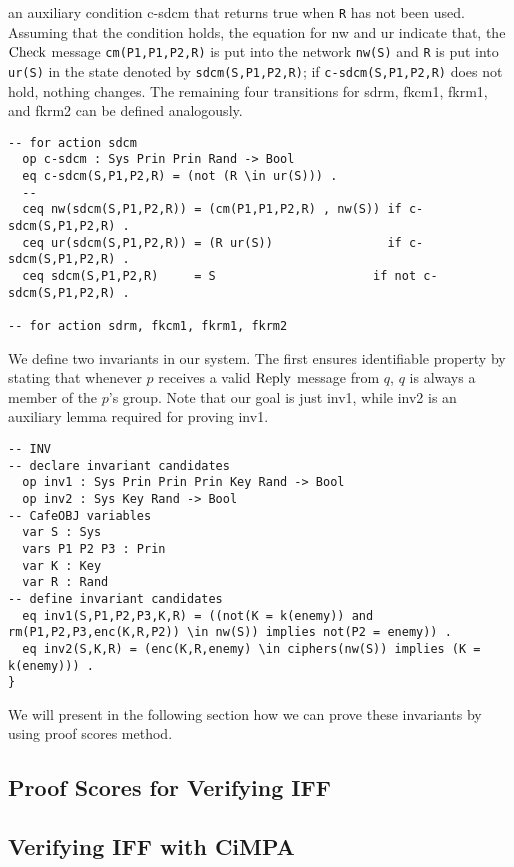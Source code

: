 \documentclass[a4paper,fleqn]{cas-dc}
\begin{document}
an auxiliary condition c-sdcm that returns true when \verb!R! has not been used. Assuming that the condition holds, the equation for nw and ur indicate that, the $\rm Check$ message \verb!cm(P1,P1,P2,R)! is put into the network \verb!nw(S)! and \verb!R! is put into \verb!ur(S)! in the state denoted by \verb!sdcm(S,P1,P2,R)!; if \verb!c-sdcm(S,P1,P2,R)! does not hold, nothing changes. The remaining four transitions for sdrm, fkcm1, fkrm1, and fkrm2 can be defined analogously.
\begin{small}
\begin{verbatim}
-- for action sdcm
  op c-sdcm : Sys Prin Prin Rand -> Bool
  eq c-sdcm(S,P1,P2,R) = (not (R \in ur(S))) .
  --
  ceq nw(sdcm(S,P1,P2,R)) = (cm(P1,P1,P2,R) , nw(S)) if c-sdcm(S,P1,P2,R) .
  ceq ur(sdcm(S,P1,P2,R)) = (R ur(S))                if c-sdcm(S,P1,P2,R) .
  ceq sdcm(S,P1,P2,R)     = S                      if not c-sdcm(S,P1,P2,R) .

-- for action sdrm, fkcm1, fkrm1, fkrm2
\end{verbatim}
\end{small}
We define two invariants in our system. The first ensures identifiable property by stating that whenever $p$ receives a valid $\rm Reply$ message from $q$, $q$ is always a member of the $p$'s group. Note that our goal is just inv1, while inv2 is an auxiliary lemma required for proving
inv1.
\begin{small}
\begin{verbatim}
-- INV
-- declare invariant candidates
  op inv1 : Sys Prin Prin Prin Key Rand -> Bool
  op inv2 : Sys Key Rand -> Bool
-- CafeOBJ variables
  var S : Sys
  vars P1 P2 P3 : Prin
  var K : Key
  var R : Rand
-- define invariant candidates
  eq inv1(S,P1,P2,P3,K,R) = ((not(K = k(enemy)) and rm(P1,P2,P3,enc(K,R,P2)) \in nw(S)) implies not(P2 = enemy)) .
  eq inv2(S,K,R) = (enc(K,R,enemy) \in ciphers(nw(S)) implies (K = k(enemy))) .
}
\end{verbatim}
\end{small}
We will present in the following section how we can prove these invariants by using proof scores method.

\subsection{Proof Scores for Verifying IFF} \label{pscores}

\subsection{Verifying IFF with CiMPA} \label{cimpa}
\end{document}
